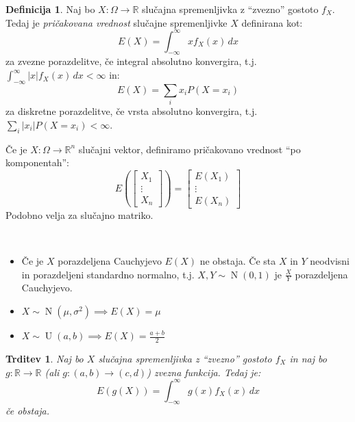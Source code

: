 \documentclass[12pt]{book}
\def\n{\noindent}
\theoremstyle{definition}
\newtheorem{definicija}{Definicija}
\theoremstyle{plain}
\theoremstyle{plain}
\newtheorem{trditev}{Trditev}
\theoremstyle{plain}
\theoremstyle{remark}
\begin{document}
\begin{definicija}
    Naj bo $X: \Omega \rightarrow \mathbb{R}$ slučajna spremenljivka z “zvezno” gostoto $f_X$. Tedaj je \emph{pričakovana vrednost} slučajne spremenljivke $X$ definirana kot: 
    $$
    E(X)=\int_{-\infty}^{\infty} x f_X(x) \, d x
    $$ 
    za zvezne porazdelitve, če integral absolutno konvergira, t.j. $\int_{-\infty}^{\infty}|x| f_X(x) \, d x<\infty$ in:
    $$
    E(X)= \sum_{i} x_i P\left(X=x_i\right) 
    $$
    za diskretne porazdelitve, če vrsta absolutno konvergira, t.j. $\sum_{i} |x_i| P\left(X=x_i\right) < \infty$.

    \n Če je $X: \Omega \rightarrow \mathbb{R}^n$ slučajni vektor, definiramo pričakovano vrednost “po komponentah”: 
    $$
    E\left(\begin{bmatrix}
        X_1 \\
        \vdots \\
        X_n
        \end{bmatrix}\right)=\begin{bmatrix}
        E(X_1) \\
        \vdots \\
        E(X_n)
        \end{bmatrix}
    $$
    Podobno velja za slučajno matriko.
\end{definicija}

\begin{zgled}
    ~
    
    \begin{itemize}
        \item Če je $X$ porazdeljena Cauchyjevo $E(X)$ ne obstaja. Če sta $X$ in $Y$ neodvisni in porazdeljeni standardno normalno, t.j. $X, Y \sim \operatorname{N}(0, 1)$ je $\frac{X}{Y}$ porazdeljena Cauchyjevo. 
        \item $X \sim \operatorname{N}\left(\mu, \sigma^2\right) \implies E(X)=\mu$
        \item $X \sim \operatorname{U}(a, b) \implies E(X)=\frac{a+b}{2}$
    \end{itemize}
\end{zgled}

\begin{trditev}
    Naj bo $X$ slučajna spremenljivka z “zvezno” gostoto $f_X$ in naj bo $g: \mathbb{R} \to  \mathbb{R}$ (ali $g:(a, b) \rightarrow(c, d)$) zvezna funkcija. Tedaj je: 
    $$
    E(g(X))=\int_{-\infty}^{\infty} g(x) f_X(x) \, d x
    $$
    če obstaja. 
\end{trditev}
\end{document}
